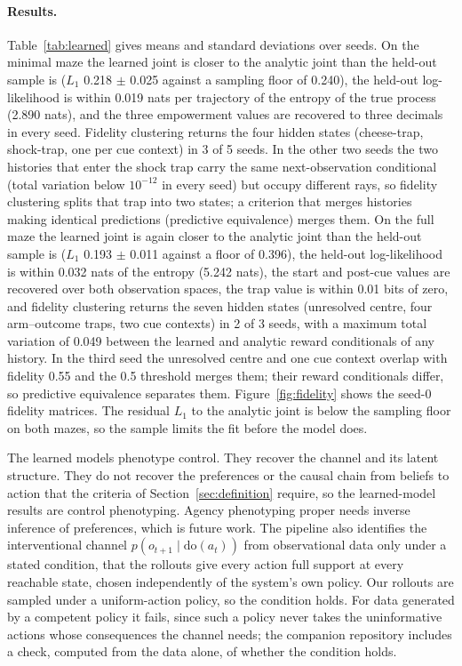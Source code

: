 \documentclass[letterpaper]{article} %
\theoremstyle{definition}
\begin{document}
\paragraph{Results.} Table~\ref{tab:learned} gives means and standard deviations over seeds. On the minimal maze the learned joint is closer to the analytic joint than the held-out sample is ($L_1$ 0.218 $\pm$ 0.025 against a sampling floor of 0.240), the held-out log-likelihood is within 0.019 nats per trajectory of the entropy of the true process (2.890 nats), and the three empowerment values are recovered to three decimals in every seed. Fidelity clustering returns the four hidden states (cheese-trap, shock-trap, one per cue context) in 3 of 5 seeds. In the other two seeds the two histories that enter the shock trap carry the same next-observation conditional (total variation below $10^{-12}$ in every seed) but occupy different rays, so fidelity clustering splits that trap into two states; a criterion that merges histories making identical predictions (predictive equivalence) merges them. On the full maze the learned joint is again closer to the analytic joint than the held-out sample is ($L_1$ 0.193 $\pm$ 0.011 against a floor of 0.396), the held-out log-likelihood is within 0.032 nats of the entropy (5.242 nats), the start and post-cue values are recovered over both observation spaces, the trap value is within 0.01 bits of zero, and fidelity clustering returns the seven hidden states (unresolved centre, four arm--outcome traps, two cue contexts) in 2 of 3 seeds, with a maximum total variation of 0.049 between the learned and analytic reward conditionals of any history. In the third seed the unresolved centre and one cue context overlap with fidelity 0.55 and the 0.5 threshold merges them; their reward conditionals differ, so predictive equivalence separates them. Figure~\ref{fig:fidelity} shows the seed-0 fidelity matrices. The residual $L_1$ to the analytic joint is below the sampling floor on both mazes, so the sample limits the fit before the model does.

The learned models phenotype control. They recover the channel and its latent structure. They do not recover the preferences or the causal chain from beliefs to action that the criteria of Section~\ref{sec:definition} require, so the learned-model results are control phenotyping. Agency phenotyping proper needs inverse inference of preferences, which is future work. The pipeline also identifies the interventional channel $p(o_{t+1} \mid \mathrm{do}(a_t))$ from observational data only under a stated condition, that the rollouts give every action full support at every reachable state, chosen independently of the system's own policy. Our rollouts are sampled under a uniform-action policy, so the condition holds. For data generated by a competent policy it fails, since such a policy never takes the uninformative actions whose consequences the channel needs; the companion repository includes a check, computed from the data alone, of whether the condition holds.
\end{document}
